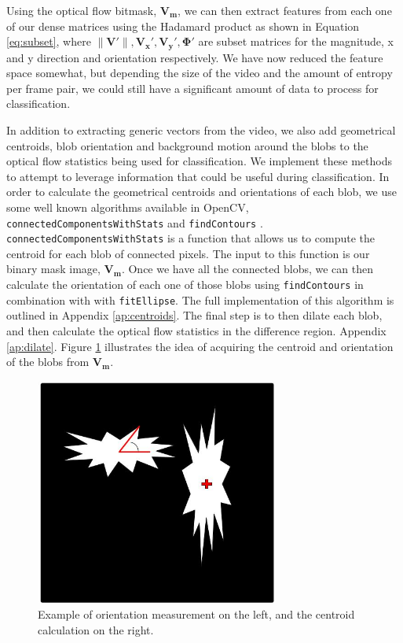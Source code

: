 Using the optical flow bitmask, $\mathbf{V_m}$, we can then extract features
from each one of our dense matrices using the Hadamard product as shown in
Equation \ref{eq:subset}, where $\|\mathbf{V\prime}\|,
\mathbf{V_x\prime},\mathbf{V_y\prime}, \mathbf{\Phi\prime}$ are subset matrices
for the magnitude, x and y direction and orientation respectively. We have now
reduced the feature space somewhat, but depending the size of the video and the
amount of entropy per frame pair, we could still have a significant amount of
data to process for classification.

In addition to extracting generic vectors from the video, we also add
geometrical centroids, blob orientation and background motion around the blobs
to the optical flow statistics being used for classification. We implement these
methods to attempt to leverage information that could be useful during
classification. In order to calculate the geometrical centroids and orientations
of each blob, we use some well known algorithms available in OpenCV,
\texttt{connectedComponentsWithStats} and \texttt{findContours}
\cite{itseez2015opencv}. \texttt{connectedComponentsWithStats} is a function
that allows us to compute the centroid for each blob of connected pixels. The
input to this function is our binary mask image, $\mathbf{V_m}$. Once we have
all the connected blobs, we can then calculate the orientation of each one of
those blobs using \texttt{findContours} in combination with with
\texttt{fitEllipse}. The full implementation of this algorithm is outlined in
Appendix \ref{ap:centroids}. The final step is to then dilate each blob, and
then calculate the optical flow statistics in the difference region. Appendix
\ref{ap:dilate}. Figure \ref{fig:orient_cent} illustrates the idea of acquiring
the centroid and orientation of the blobs from $\mathbf{V_m}$.

\begin{figure}[h]
  \label{fig:orient_cent}
  \centering
  \includegraphics[width=8cm]{figures/cent_and_orient}
  \caption{Example of orientation measurement on the left, and the centroid calculation on the right.}
\end{figure}

